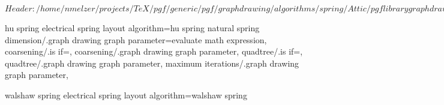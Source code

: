%
%
%

\ProvidesFileRCS[v\pgfversion] $Header: /home/nmelzer/projects/TeX/pgf/generic/pgf/graphdrawing/algorithms/spring/Attic/pgflibrarygraphdrawing.spring.code.tex,v 1.2 2011/05/06 16:11:12 jannis-pohlmann Exp $







%
%



%
% 
%
\pgfgddeclarealgorithmkey
  {hu spring electrical}
  {spring layout}
  {algorithm=hu spring}
  {
    natural spring dimension/.graph drawing graph parameter=evaluate math expression,
    coarsening/.is if=,
    coarsening/.graph drawing graph parameter,
    quadtree/.is if=,
    quadtree/.graph drawing graph parameter,
    maximum iterations/.graph drawing graph parameter,
  }



%
%
%
\pgfgddeclarealgorithmkey
  {walshaw spring electrical}
  {spring layout}
  {algorithm=walshaw spring}
  {}
